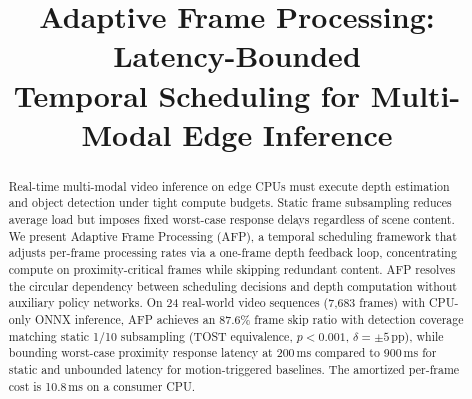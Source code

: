 \documentclass[conference]{IEEEtran}
\begin{document}
\title{Adaptive Frame Processing: Latency-Bounded\\
Temporal Scheduling for Multi-Modal Edge Inference}

\author{
\and
{}
\and
{}
}



\maketitle

\begin{abstract}
Real-time multi-modal video inference on edge CPUs must execute
depth estimation and object detection under tight compute budgets.
Static frame subsampling reduces average load but imposes fixed
worst-case response delays regardless of scene content. We present
Adaptive Frame Processing (AFP), a temporal scheduling framework
that adjusts per-frame processing rates via a one-frame depth
feedback loop, concentrating compute on proximity-critical frames
while skipping redundant content. AFP resolves the circular
dependency between scheduling decisions and depth computation
without auxiliary policy networks. On 24 real-world video sequences
(7,683 frames) with CPU-only ONNX inference, AFP achieves an
87.6\% frame skip ratio with detection coverage matching static
1/10 subsampling (TOST equivalence, $p < 0.001$,
$\delta{=}{\pm}5$\,pp), while
bounding worst-case proximity response latency at 200\,ms compared
to 900\,ms for static and unbounded latency for motion-triggered
baselines. The amortized per-frame cost is 10.8\,ms on a consumer
CPU.
\end{abstract}
\end{document}
